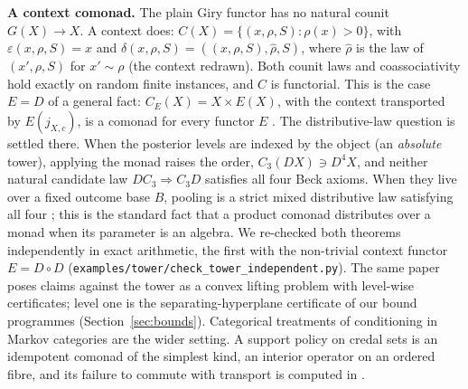 \documentclass[11pt]{article}
\theoremstyle{definition}
\theoremstyle{remark}
\begin{document}
\textbf{A context comonad.} The plain Giry functor has no natural counit $G(X)\to X$. A context does: $C(X)=\{(x,\rho,S):\rho(x)>0\}$, with $\varepsilon(x,\rho,S)=x$ and $\delta(x,\rho,S)=((x,\rho,S),\hat\rho,S)$, where $\hat\rho$ is the law of $(x',\rho,S)$ for $x'\sim\rho$ (the context redrawn). Both counit laws and coassociativity hold exactly on random finite instances, and $C$ is functorial. This is the case $E=D$ of a general fact: $C_E(X)=X\times E(X)$, with the context transported by $E(j_{X,c})$, is a comonad for every functor $E$ \cite[Thm.~6.1]{awasthiT}. The distributive-law question is settled there. When the posterior levels are indexed by the object (an \emph{absolute} tower), applying the monad raises the order, $C_3(DX)\ni D^4X$, and neither natural candidate law $DC_3\Rightarrow C_3D$ satisfies all four Beck axioms. When they live over a fixed outcome base $B$, pooling is a strict mixed distributive law satisfying all four \cite[Thm.~9.8]{awasthiT}; this is the standard fact that a product comonad distributes over a monad when its parameter is an algebra. We re-checked both theorems independently in exact arithmetic, the first with the non-trivial context functor $E=D\circ D$ (\texttt{examples/tower/check\_tower\_independent.py}). The same paper poses claims against the tower as a convex lifting problem with level-wise certificates; level one is the separating-hyperplane certificate of our bound programmes (Section~\ref{sec:bounds}). Categorical treatments of conditioning in Markov categories \cite{fritz,steinstaton21} are the wider setting. A support policy on credal sets is an idempotent comonad of the simplest kind, an interior operator on an ordered fibre, and its failure to commute with transport is computed in \cite[Prop.~10.24]{awasthiT}.
\end{document}
